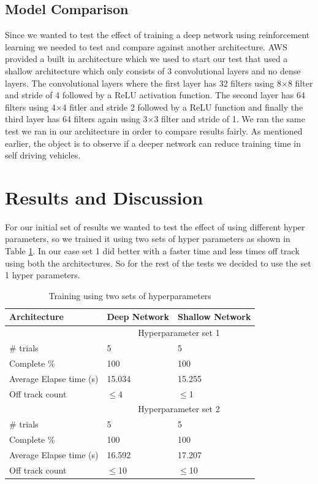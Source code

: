 \documentclass[journal]{IEEEtran}
\begin{document}
\subsection{Model Comparison}
Since we wanted to test the effect of training a deep network using reinforcement learning we needed to test and compare against another architecture.  AWS provided a built in architecture which we used to start our test that used a shallow architecture which only consists of 3 convolutional layers and no dense layers. The convolutional layers where the first layer has 32 filters using 8$\times$8 filter and stride of 4 followed by a ReLU activation function.  The second layer has 64 filters using 4$\times$4 fitler and stride 2 followed by a ReLU function and finally the third layer has 64 filters again using 3$\times$3 filter and stride of 1.  We ran the same test we ran in our architecture in order to compare results fairly.  As mentioned earlier, the object is to observe if a deeper network can reduce training time in self driving vehicles.

\section{Results and Discussion}
For our initial set of results we wanted to test the effect of using different hyper parameters, so we trained it using two sets of hyper parameters as shown in Table \ref{twoHyperSets}.  In our case set 1 did better with a faster time and less times off track using both the architectures.  So for the rest of the tests we decided to use the set 1 hyper parameters.

\begin{table}
\centering
\caption{Training using two sets of hyperparameters}
\begin{tabular}{ |p{4cm}||p{2cm}|p{2cm}|  }
\hline
Architecture & Deep Network & Shallow Network \\
\hline
 \multicolumn{1}{|c||}{} & \multicolumn{2}{|c|}{Hyperparameter set 1} \\
\hline
\# trials & 5  & 5 \\
 Complete \% &  100 & 100 \\
Average Elapse time (s) & 15.034 & 15.255\\
 Off track count  & $\leq$4 & $\leq$1 \\
\hline
 \multicolumn{1}{|c||}{} & \multicolumn{2}{|c|}{Hyperparameter set 2} \\
\hline
\# trials & 5  & 5 \\
 Complete \% &  100 & 100 \\
Average Elapse time (s) & 16.592 & 17.207\\
 Off track count  & $\leq$10 & $\leq$10 \\
 \hline
\end{tabular}
\label{twoHyperSets}
\end{table}
\end{document}
